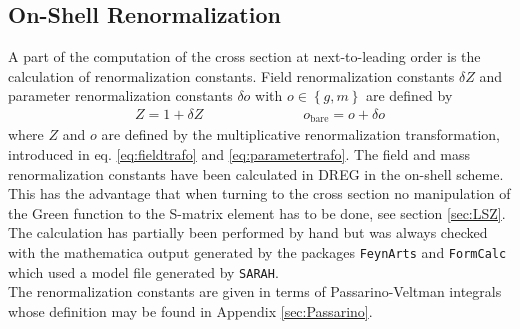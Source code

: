 \subsection{On-Shell Renormalization}\label{sec:QuarkSE}
A part of the computation of the cross section at next-to-leading order is the calculation of renormalization constants. 
Field renormalization constants $\delta Z$ and parameter renormalization constants $\delta o$ with $o \in \left\{ g, m \right\}$ are defined by
\begin{align}
Z = 1 + \delta Z \hspace{3cm} o_{\mathrm{bare}} = o + \delta o
\end{align}
where $Z$ and $o$ are defined by the multiplicative renormalization transformation, introduced in eq. \eqref{eq:fieldtrafo} and \eqref{eq:parametertrafo}. The field and mass renormalization constants have been calculated in DREG in the on-shell scheme. This has the advantage that when turning to the cross section no manipulation of the Green function to the S-matrix element has to be done, see section \ref{sec:LSZ}.\\
The calculation has partially been performed by hand but was always checked with the mathematica output generated by the packages  \texttt{FeynArts} \cite{Hahn:2000} and \texttt{FormCalc} \cite{ChokoufeNejad:2013qja, Hahn:1998yk} which used a model file generated by \texttt{SARAH}\cite{Staub:2013tta, Staub:2012pb, Staub:2010jh, Staub:2009bi}.\\
The renormalization constants are given in terms of Passarino-Veltman integrals whose definition may be found in Appendix \ref{sec:Passarino}.

